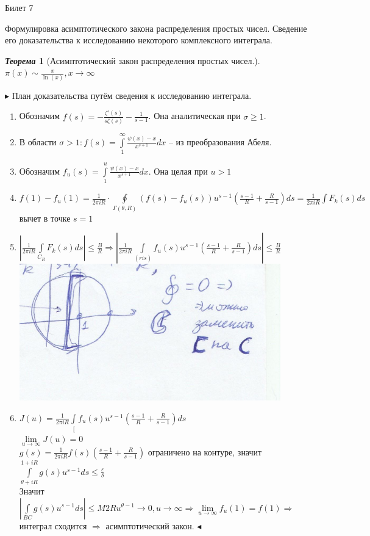 \documentclass[a4paper,12pt]{article}
\newtheorem{teo}{\textit{Теорема}}
\newcommand{\TE}{\theta}
\newcommand{\SI}{\psi}
\newcommand{\q}{\quad}
\newcommand{\pb}{\blacktriangleright}
\newcommand{\pe}{\blacktriangleleft}
\newcommand{\Ra}{\Rightarrow}
\newcommand{\IL}{\int\limits}
\newcommand{\os}{\left(}
\newcommand{\cs}{\right)}
\begin{document}
\newpage
\begin{mybox}{\hypertarget{bil7}{Билет 7}}

\begin{formbox}{}
Формулировка асимптотического закона распределения простых чисел. Сведение его доказательства к исследованию некоторого комплексного интеграла.
\end{formbox}
\begin{formbox}{}
\begin{teo}[Асимптотический закон распределения простых чисел.]\q\\
$\pi(x)\sim \frac{x}{\ln(x)}, x\to\infty$
\end{teo}
\end{formbox}
$\pb$
План доказательства путём сведения к исследованию интеграла.
\begin{enumerate}
    \item Обозначим $f(s) = -\frac{\zeta'(s)}{s\zeta(s)} - \frac{1}{s-1}$. Она аналитическая при $\sigma \ge 1$.
    \item В области $\sigma > 1: f(s) =\IL_1^\infty\frac{\SI(x) - x}{x^{s+1}}dx $ -- из преобразования Абеля.
\item Обозначим $f_u(s) = \IL_1^u\frac{\SI(x) - x}{x^{s+1}}dx$. Она целая при $u > 1$
\item $f(1) - f_u(1) = \frac{1}{2\pi i R} \cdot \oint\limits_{\Gamma(\TE, R)} (f(s) - f_u(s))u^{s-1}\os \frac{s-1}{R} + \frac{R} {s-1} \cs ds = \frac{1}{2\pi i R}\int F_k(s)ds $ вычет в точке $s=1$
\item $\left| \frac{1}{2\pi i R} \IL_{C_R}F_k(s)ds \right| \le \frac{B}{R}  \Ra \left| \frac{1}{2\pi i R} \IL_{(ris)} f_u(s) u^{s-1} \os \frac{s-1}{R} + \frac{R}{s-1}  \cs  ds \right| \le \frac{B}{R} $
\includegraphics{p1.png}\q\\
\item $J(u) =  \frac{1}{2\pi i R} \IL_{[} f_u(s) u^{s-1} \os \frac{s-1}{R} + \frac{R}{s-1}  \cs ds $\\
$\lim\limits_{u\to\infty} J(u) = 0$\\
$g(s) = \frac{1}{2\pi i R}f(s)\os \frac{s-1}{R} + \frac{R}{s-1}    \cs $ ограничено на контуре, значит $\IL_{\TE+iR}^{1+iR}g(s) u^{s-1}ds \le \frac{\varepsilon}{\delta} $\\
Значит $|\IL_{BC} g(s)u^{s-1}ds |\le M2Ru^{\TE-1}\to0, u\to\infty\Ra \lim\limits_{u\to\infty}f_u(1) = f(1)\Ra $ интеграл сходится $\Ra$ асимптотический закон. $\pe$
\end{enumerate}
\end{mybox}
\end{document}
